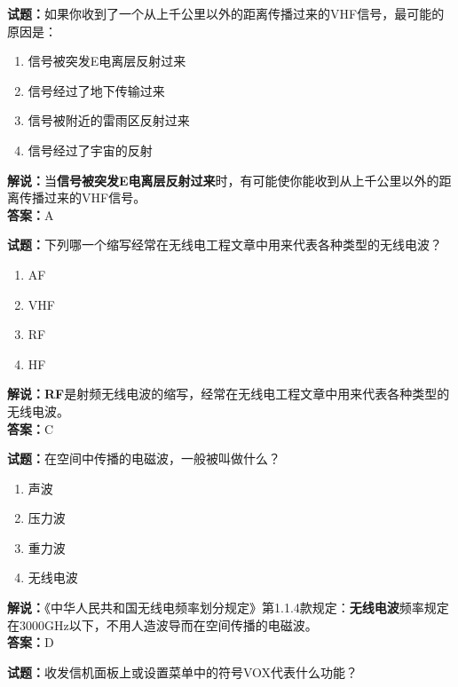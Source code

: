 \documentclass{ctexbook}
\begin{document}
\bigskip


\noindent\textbf{试题：}如果你收到了一个从上千公里以外的距离传播过来的VHF信号，最可能的原因是：

\begin{enumerate}[leftmargin=3em]
	\item 信号被突发E电离层反射过来
	\item 信号经过了地下传输过来
	\item 信号被附近的雷雨区反射过来
	\item 信号经过了宇宙的反射
\end{enumerate}

\noindent\textbf{解说：}当\textbf{信号被突发E电离层反射过来}时，有可能使你能收到从上千公里以外的距离传播过来的VHF信号。\\\noindent\textbf{答案：}A


\bigskip


\noindent\textbf{试题：}下列哪一个缩写经常在无线电工程文章中用来代表各种类型的无线电波？

\begin{enumerate}[leftmargin=3em]
	\item AF
	\item VHF
	\item RF
	\item HF
\end{enumerate}

\noindent\textbf{解说：RF}是射频无线电波的缩写，经常在无线电工程文章中用来代表各种类型的无线电波。\\\noindent\textbf{答案：}C


\bigskip


\noindent\textbf{试题：}在空间中传播的电磁波，一般被叫做什么？

\begin{enumerate}[leftmargin=3em]
	\item 声波
	\item 压力波
	\item 重力波
	\item 无线电波
\end{enumerate}

\noindent\textbf{解说：}《中华人民共和国无线电频率划分规定》第1.1.4款规定：\textbf{无线电波}频率规定在3000GHz以下，不用人造波导而在空间传播的电磁波。\\\noindent\textbf{答案：}D


\bigskip


\noindent\textbf{试题：}收发信机面板上或设置菜单中的符号VOX代表什么功能？
\end{document}
